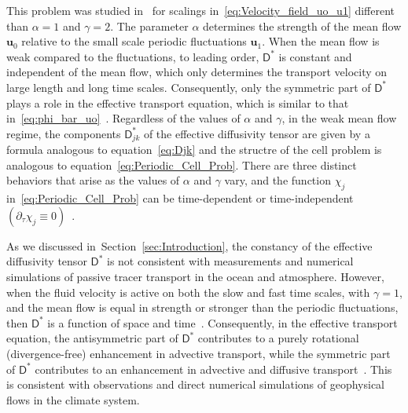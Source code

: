 \documentclass[leqno,onefignum,onetabnum]{siamltex1213}
\newcommand{\secref}[1]{Section~\ref{#1}}
\newcommand{\Dm}{\mathsf{D}}
\newcommand{\vecu}{\boldsymbol{u}}
\begin{document}
This problem was studied in~\cite{Pavliotis:PHD_Thesis} for 
scalings in~\eqref{eq:Velocity_field_uo_u1} different than $\alpha=1$ and
$\gamma=2$. The parameter $\alpha$ determines the strength of the mean flow $\vecu_0$
relative to the small scale periodic fluctuations $\vecu_1$. When the
mean flow is weak compared to the fluctuations, to leading order,
$\Dm^*$ is constant and independent of the mean flow, which only
determines the transport velocity on large length and long time
scales. Consequently, only the symmetric part of $\Dm^*$ plays a role
in the effective transport equation, which is similar to that
in~\eqref{eq:phi_bar_uo}~\cite{Pavliotis:PHD_Thesis}. Regardless of
the values of $\alpha$ and $\gamma$, in the weak mean flow regime, the
components $\Dm^*_{jk}$ of the effective diffusivity tensor are given
by a formula analogous to equation~\eqref{eq:Djk} and the structre of
the cell problem is analogous to
equation~\eqref{eq:Periodic_Cell_Prob}. There are three distinct
behaviors that arise as the values of $\alpha$ and $\gamma$ vary, and the
function $\chi_j$ in~\eqref{eq:Periodic_Cell_Prob} can be time-dependent
or time-independent $(\partial_\tau\chi_j\equiv0)$~\cite{Pavliotis:PHD_Thesis}.



As we discussed in~\secref{sec:Introduction}, the constancy of the
effective diffusivity tensor $\Dm^*$ is not consistent with
measurements and numerical simulations of passive tracer transport in
the ocean and atmosphere. However, when the fluid velocity is active
on both the slow and fast time scales, with $\gamma=1$, and the mean flow
is equal in strength or stronger than the periodic fluctuations, then
$\Dm^*$ is a function of space and
time~\cite{Pavliotis:PHD_Thesis}. Consequently, in the effective 
transport equation, the antisymmetric part of $\Dm^*$ contributes to a
purely rotational (divergence-free) enhancement in advective
transport, while the symmetric part of $\Dm^*$ contributes to an
enhancement in advective and diffusive
transport~\cite{Pavliotis:PHD_Thesis}. This is consistent with
observations and direct numerical simulations of geophysical flows in
the climate system. 
\end{document}
